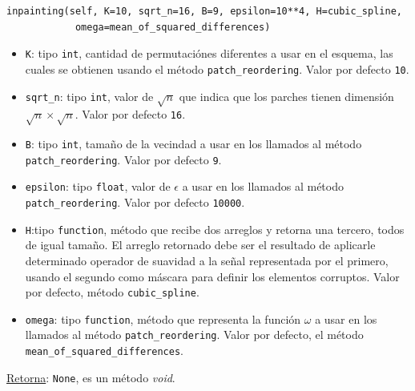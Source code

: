 \begin{itemize}
	\begin{lstlisting}
inpainting(self, K=10, sqrt_n=16, B=9, epsilon=10**4, H=cubic_spline,
			omega=mean_of_squared_differences)
	\end{lstlisting}
	\begin{itemize}
		\item \texttt{K}: tipo \texttt{int}, cantidad de permutaci\'ones diferentes a usar en el esquema, las cuales se obtienen usando el m\'etodo \texttt{patch\_reordering}. Valor por defecto \texttt{10}.
		\item \texttt{sqrt\_n}: tipo \texttt{int}, valor de $\sqrt{n}$ que indica que los parches tienen dimensi\'on $\sqrt{n} \times \sqrt{n}$. Valor por defecto \texttt{16}.
		\item \texttt{B}: tipo \texttt{int}, tamaño de la vecindad a usar en los llamados al m\'etodo \texttt{patch\_reordering}. Valor por defecto \texttt{9}.
		\item \texttt{epsilon}: tipo \texttt{float}, valor de $\epsilon$ a usar en los llamados al m\'etodo \\\texttt{patch\_reordering}. Valor por defecto \texttt{10000}.
		\item \texttt{H}:tipo \texttt{function}, m\'etodo que recibe dos arreglos y retorna una tercero, todos de igual tamaño. El arreglo retornado debe ser el resultado de aplicarle determinado operador de suavidad a la señal representada por el primero, usando el segundo como m\'ascara para definir los elementos corruptos. Valor por defecto, m\'etodo \texttt{cubic\_spline}.
		\item \texttt{omega}: tipo \texttt{function}, m\'etodo que representa la funci\'on $\omega$ a usar en los llamados al m\'etodo \texttt{patch\_reordering}. Valor por defecto, el m\'etodo \texttt{mean\_of\_squared\_differences}.
	\end{itemize}
	\underline{Retorna}: \texttt{None}, es un m\'etodo \textit{void}.
\end{itemize}

